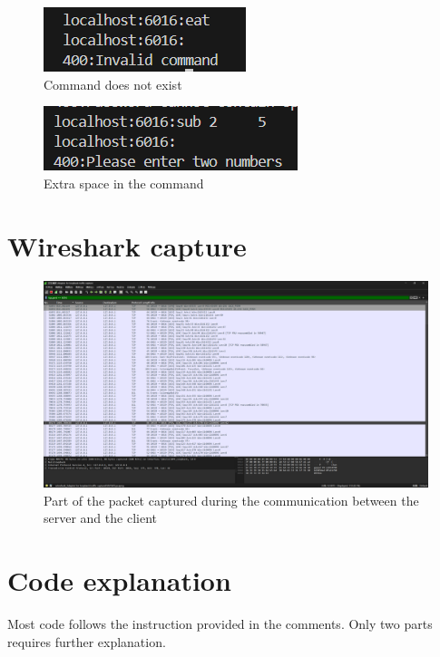 \documentclass[a4paper,12pt]{article}
\begin{document}
\begin{figure}[H]
    \centering
    \includegraphics[width=0.5\linewidth]{figure/exception4.1.png}
    \caption{Command does not exist}
\end{figure}

\begin{figure}[H]
    \centering
    \includegraphics[width=0.5\linewidth]{figure/exception5.png}
    \caption{Extra space in the command}
\end{figure}

\section{Wireshark capture}

\begin{figure}[H]
    \centering
    \includegraphics[width=\linewidth]{figure/wireshark.png}
    \caption{Part of the packet captured during the communication between the server and the client}
\end{figure}

\section{Code explanation}

Most code follows the instruction provided in the comments.
Only two parts requires further explanation.
\end{document}
